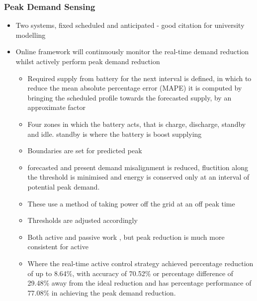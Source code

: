\subsubsection{Peak Demand Sensing}\label{peak-demand-sensing}

\begin{itemize}
\tightlist
\item
  Two systems, fixed scheduled and anticipated \cite{20164002874437} -
  good citation for university modelling
\item
  Online framework will continuously monitor the real-time demand
  reduction whilst actively perform peak demand reduction

  \begin{itemize}
  \tightlist
  \item
    Required supply from battery for the next interval is defined, in
    which to reduce the mean absolute percentage error (MAPE) it is
    computed by bringing the scheduled profile towards the forecasted
    supply, by an approximate factor
  \item
    Four zones in which the battery acts, that is charge, discharge,
    standby and idle. standby is where the battery is boost supplying
  \item
    Boundaries are set for predicted peak
  \item
    forecasted and present demand misalignment is reduced, fluctition
    along the threshold is minimised and energy is conserved only at an
    interval of potential peak demand.
  \item
    These use a method of taking power off the grid at an off peak time
  \item
    Thresholds are adjusted accordingly
  \item
    Both active and passive work , but peak reduction is much more
    consistent for active
  \item
    Where the real-time active control strategy achieved percentage
    reduction of up to 8.64\%, with accuracy of 70.52\% or percentage
    difference of 29.48\% away from the ideal reduction and has
    percentage performance of 77.08\% in achieving the peak demand
    reduction.
  \end{itemize}
\end{itemize}
